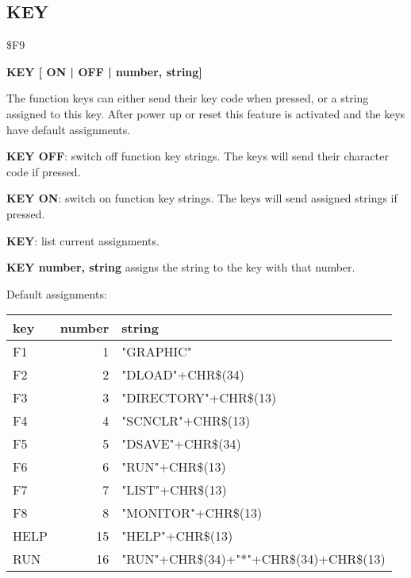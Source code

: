 \subsection{KEY}
\begin{description}[leftmargin=2cm,style=nextline]
\item [Token:] \$F9
\item [Format:] {\bf KEY [ ON | OFF | number, string]}
\item [Usage:] The function keys can either send their key code
               when pressed, or a string assigned to this key.
               After power up or reset this feature is activated
               and the keys have default assignments.

               {\bf KEY OFF}: switch off function key strings.
               The keys will send their character code if pressed.

               {\bf KEY ON}: switch on function key strings.
               The keys will send assigned strings if pressed.

               {\bf KEY}: list current assignments.

               {\bf KEY number, string} assigns the string to
               the key with that number.

               Default assignments:

{\setlength{\tabcolsep}{1mm}
\ttfamily
\begin{tabular}{|l|r|l|}
\hline
  key  & number & string \\
\hline
F1     &  1 & "GRAPHIC" \\
F2     &  2 & "DLOAD"+CHR\$(34) \\
F3     &  3 & "DIRECTORY"+CHR\$(13) \\
F4     &  4 & "SCNCLR"+CHR\$(13) \\
F5     &  5 & "DSAVE"+CHR\$(34) \\
F6     &  6 & "RUN"+CHR\$(13) \\
F7     &  7 & "LIST"+CHR\$(13) \\
F8     &  8 & "MONITOR"+CHR\$(13) \\
HELP   & 15 & "HELP"+CHR\$(13) \\
RUN    & 16 & "RUN"+CHR\$(34)+"*"+CHR\$(34)+CHR\$(13) \\
\hline
\end{tabular}
}


\end{description}
